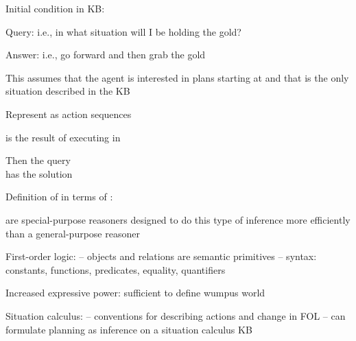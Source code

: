 \documentclass{article}
\begin{document}
\begin{huge}

Initial condition in KB:\nl
   \nl

Query: \nl
   i.e., in what situation will I be holding the gold?

Answer: \nl
   i.e., go forward and then grab the gold

This assumes that the agent is interested in plans starting at 
and that  is the only situation described in the KB



Represent  as action sequences \mat{$[a_1,a_2,\ldots,a_n]$}

 is the result of executing  in 

Then the query \\
has the solution 

Definition of  in terms of :\al
   \al

 are special-purpose reasoners designed to do this
type of inference more efficiently than a general-purpose reasoner


First-order logic: \al
-- objects and relations are semantic primitives\al
-- syntax: constants, functions, predicates, equality, quantifiers

Increased expressive power: sufficient to define wumpus world 

Situation calculus:\al
-- conventions for describing actions and change in FOL\al
-- can formulate planning as inference on a situation calculus KB


\end{huge} 
\end{document}
